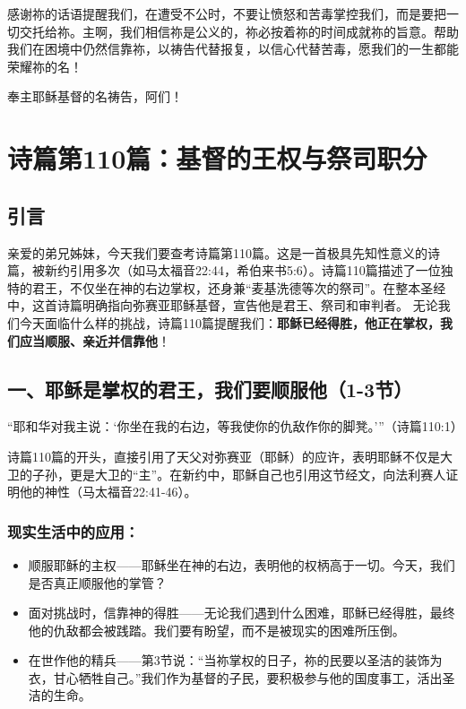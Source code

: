 \documentclass[a4paper, 12pt]{article}
\begin{document}
感谢祢的话语提醒我们，在遭受不公时，不要让愤怒和苦毒掌控我们，而是要把一切交托给祢。主啊，我们相信祢是公义的，祢必按着祢的时间成就祢的旨意。帮助我们在困境中仍然信靠祢，以祷告代替报复，以信心代替苦毒，愿我们的一生都能荣耀祢的名！

奉主耶稣基督的名祷告，阿们！
\newpage
\section{诗篇第110篇：基督的王权与祭司职分}
\subsection*{引言}
亲爱的弟兄姊妹，今天我们要查考诗篇第110篇。这是一首极具先知性意义的诗篇，被新约引用多次（如马太福音22:44，希伯来书5:6）。诗篇110篇描述了一位独特的君王，不仅坐在神的右边掌权，还身兼“麦基洗德等次的祭司”。在整本圣经中，这首诗篇明确指向弥赛亚耶稣基督，宣告他是君王、祭司和审判者。
无论我们今天面临什么样的挑战，诗篇110篇提醒我们：\textbf{耶稣已经得胜，他正在掌权，我们应当顺服、亲近并信靠他}！

\subsection*{一、耶稣是掌权的君王，我们要顺服他（1-3节）}
“耶和华对我主说：‘你坐在我的右边，等我使你的仇敌作你的脚凳。’”（诗篇110:1）

诗篇110篇的开头，直接引用了天父对弥赛亚（耶稣）的应许，表明耶稣不仅是大卫的子孙，更是大卫的“主”。在新约中，耶稣自己也引用这节经文，向法利赛人证明他的神性（马太福音22:41-46）。

\subsubsection*{现实生活中的应用：}
\begin{itemize}
    \item 顺服耶稣的主权——耶稣坐在神的右边，表明他的权柄高于一切。今天，我们是否真正顺服他的掌管？

    \item 面对挑战时，信靠神的得胜——无论我们遇到什么困难，耶稣已经得胜，最终他的仇敌都会被践踏。我们要有盼望，而不是被现实的困难所压倒。

    \item 在世作他的精兵——第3节说：“当祢掌权的日子，祢的民要以圣洁的装饰为衣，甘心牺牲自己。”我们作为基督的子民，要积极参与他的国度事工，活出圣洁的生命。

\end{itemize}
\end{document}
